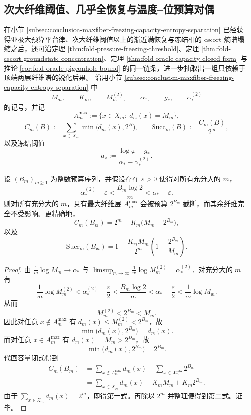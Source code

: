\subsection{次大纤维阈值、几乎全恢复与温度--位预算对偶}\label{subsec:conclusion-secondwindow-ae-threshold-temperature-budget-duality}
在小节 \ref{subsec:conclusion-maxfiber-freezing-capacity-entropy-separation} 已经获得亚极大预算平台律、次大纤维阈值以上的渐近满恢复与冻结相的 escort 熵谱塌缩之后，还可沿定理 \ref{thm:fold-pressure-freezing-threshold}、定理 \ref{thm:fold-escort-groundstate-concentration}、定理 \ref{thm:fold-oracle-capacity-closed-form} 与推论 \ref{cor:fold-oracle-pigeonhole-bound} 的同一链条，进一步抽取出一组只依赖于顶端两层纤维谱的锐化后果。
沿用小节 \ref{subsec:conclusion-maxfiber-freezing-capacity-entropy-separation} 中
\[
M_m,\qquad
K_m,\qquad
M_m^{(2)},\qquad
\alpha_\ast,\qquad
g_\ast,\qquad
\alpha_\ast^{(2)}
\]
的记号，并记
\[
A_m^{\max}:=\{x\in X_m:\ d_m(x)=M_m\},
\]
\[
C_m(B):=\sum_{x\in X_m}\min\bigl(d_m(x),2^B\bigr),
\qquad
\mathrm{Succ}_m(B):=\frac{C_m(B)}{2^m},
\]
以及冻结阈值
\[
a_{\mathrm c}:=\frac{\log\varphi-g_\ast}{\alpha_\ast-\alpha_\ast^{(2)}}.
\]

\begin{theorem}[二阶窗口中的仅最大纤维剪切精确公式]\label{thm:conclusion-second-window-maxfiber-only-shear}
设 \((B_m)_{m\ge 1}\) 为整数预算序列，并假设存在 \(\varepsilon>0\) 使得对所有充分大的 \(m\)，
\[
\alpha_\ast^{(2)}+\varepsilon
<
\frac{B_m\log 2}{m}
<
\alpha_\ast-\varepsilon.
\]
则对所有充分大的 \(m\)，只有最大纤维层 \(A_m^{\max}\) 会被预算 \(2^{B_m}\) 截断，而其余纤维完全不受影响。更精确地，
\[
C_m(B_m)=2^m-K_m\bigl(M_m-2^{B_m}\bigr),
\]
以及
\[
\mathrm{Succ}_m(B_m)
=
1-\frac{K_mM_m}{2^m}\left(1-\frac{2^{B_m}}{M_m}\right).
\]
\end{theorem}
\begin{proof}
由 \(\frac1m\log M_m\to \alpha_\ast\) 与
\(\limsup_{m\to\infty}\frac1m\log M_m^{(2)}=\alpha_\ast^{(2)}\)，对充分大的 \(m\) 有
\[
\frac1m\log M_m^{(2)}
<
\alpha_\ast^{(2)}+\frac{\varepsilon}{2}
<
\frac{B_m\log 2}{m}
<
\alpha_\ast-\frac{\varepsilon}{2}
<
\frac1m\log M_m.
\]
从而
\[
M_m^{(2)}<2^{B_m}<M_m.
\]
因此对任意 \(x\notin A_m^{\max}\) 有 \(d_m(x)\le M_m^{(2)}<2^{B_m}\)，故
\[
\min\bigl(d_m(x),2^{B_m}\bigr)=d_m(x).
\]
而对任意 \(x\in A_m^{\max}\) 有 \(d_m(x)=M_m>2^{B_m}\)，故
\[
\min\bigl(d_m(x),2^{B_m}\bigr)=2^{B_m}.
\]
代回容量闭式得到
\[
\begin{aligned}
C_m(B_m)
&=
\sum_{x\notin A_m^{\max}}d_m(x)+\sum_{x\in A_m^{\max}}2^{B_m}\\
&=
\sum_{x\in X_m}d_m(x)-K_mM_m+K_m2^{B_m}.
\end{aligned}
\]
由于 \(\sum_{x\in X_m}d_m(x)=2^m\)，即得第一式。再除以 \(2^m\) 并整理便得到第二式。证毕。
\end{proof}

